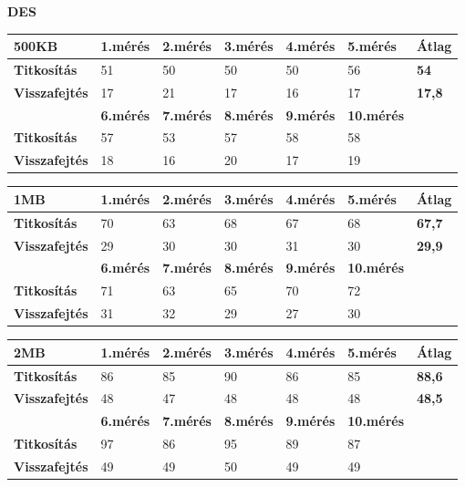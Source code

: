 \newpage \noindent \textbf{DES}

\begin{center}
	
	
	\begin{tabular}{|p{2.4cm}|p{1.7cm}|p{1.7cm}|p{1.7cm}|p{1.7cm}|p{1.8cm}|p{1.2cm}|}
		\hline
		\textbf{500KB} & \textbf{1.mérés} & \textbf{2.mérés} & \textbf{3.mérés} & \textbf{4.mérés} & \textbf{5.mérés} & \textbf{Átlag} \\
		\hline
		\textbf{Titkosítás}&51&50&50&50&56&\textbf{54} \\
		\hline
		\textbf{Visszafejtés}&17&21&17&16&17&\textbf{17,8} \\
		\hline
		& \textbf{6.mérés} & \textbf{7.mérés} & \textbf{8.mérés} & \textbf{9.mérés} & \textbf{10.mérés} & \\
		\hline
		\textbf{Titkosítás}&57&53&57&58&58&\\
		\hline
		\textbf{Visszafejtés}&18&16&20&17&19&\\
		\hline
	\end{tabular}
\end{center}

\begin{center}
	
	
	\begin{tabular}{|p{2.4cm}|p{1.7cm}|p{1.7cm}|p{1.7cm}|p{1.7cm}|p{1.8cm}|p{1.2cm}|}
		\hline
		\textbf{1MB} & \textbf{1.mérés} & \textbf{2.mérés} & \textbf{3.mérés} & \textbf{4.mérés} & \textbf{5.mérés} & \textbf{Átlag} \\
		\hline
		\textbf{Titkosítás}&70&63&68&67&68&\textbf{67,7} \\
		\hline
		\textbf{Visszafejtés}&29&30&30&31&30&\textbf{29,9}  \\
		\hline
		& \textbf{6.mérés} & \textbf{7.mérés} & \textbf{8.mérés} & \textbf{9.mérés} & \textbf{10.mérés} & \\
		\hline
		\textbf{Titkosítás}&71&63&65&70&72& \\
		\hline
		\textbf{Visszafejtés}&31&32&29&27&30& \\
		\hline
	\end{tabular}
\end{center}

\begin{center}
	
	
	\begin{tabular}{|p{2.4cm}|p{1.7cm}|p{1.7cm}|p{1.7cm}|p{1.7cm}|p{1.8cm}|p{1.2cm}|}
		\hline
		\textbf{2MB} & \textbf{1.mérés} & \textbf{2.mérés} & \textbf{3.mérés} & \textbf{4.mérés} & \textbf{5.mérés} & \textbf{Átlag} \\
		\hline
		\textbf{Titkosítás}&86&85&90&86&85&\textbf{88,6}\\
		\hline
		\textbf{Visszafejtés}&48&47&48&48&48&\textbf{48,5} \\
		\hline
		& \textbf{6.mérés} & \textbf{7.mérés} & \textbf{8.mérés} & \textbf{9.mérés} & \textbf{10.mérés} & \\
		\hline
		\textbf{Titkosítás}&97&86&95&89&87& \\
		\hline
		\textbf{Visszafejtés}&49&49&50&49&49& \\
		\hline
	\end{tabular}
\end{center}

